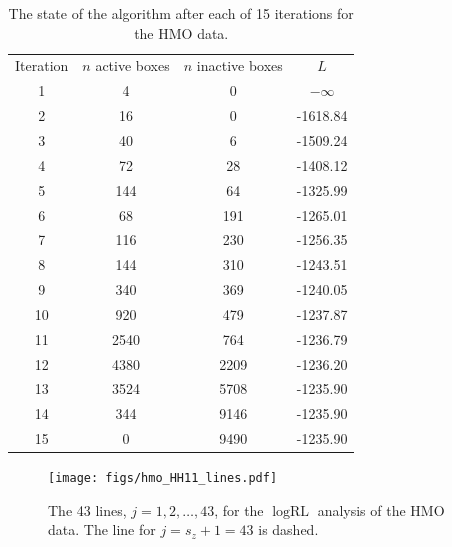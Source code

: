 \documentclass[ejs]{imsart}
\newcommand{\RLorig}{\text{RL}}
\newcommand{\logRLorig}{\log\RLorig}
\begin{document}
\begin{table}[h]
\centering
\begin{tabular}{|c|c|c|c|}
\hline
Iteration & $n$ active boxes & $n$ inactive boxes & $L$\\
1 & 4 & 0 & $-\infty$\\
2 & 16 & 0 & -1618.84\\
3 & 40 & 6 & -1509.24\\
4 & 72 & 28 & -1408.12\\
5 & 144 & 64 & -1325.99\\
6 & 68 & 191 & -1265.01\\
7 & 116 & 230 & -1256.35\\
8 & 144 & 310 & -1243.51\\
9 & 340 & 369 & -1240.05\\
10 & 920 & 479 & -1237.87\\
11 & 2540 & 764 & -1236.79\\
12 & 4380 & 2209 & -1236.20\\
13 & 3524 & 5708 & -1235.90\\
14 & 344 & 9146 & -1235.90\\
15 & 0 & 9490 & -1235.90\\
\hline
\end{tabular}
\caption{The state of the algorithm after each of 15 iterations for the HMO data.}
\label{table:hmo_HH11_run}
\end{table}

\begin{figure}
	\centering
	\texttt{[image: figs/hmo\_HH11\_lines.pdf]}
	\caption{The 43 lines, $j=1, 2, \dots, 43$, for the $\logRLorig$ analysis of the HMO data.
	              The line for $j = s_z+1 = 43$ is dashed.}
	\label{fig:hmolines}
\end{figure}
\end{document}
